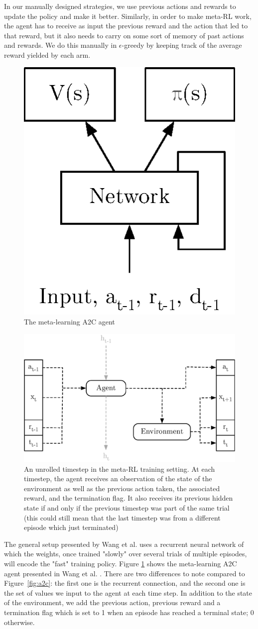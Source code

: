 In our manually designed strategies, we use previous actions and rewards
to update the policy and make it better. Similarly, in order to
make meta-RL work, the agent has to receive as input the previous reward
and the action that led to that reward, but it also needs to carry on some
sort of memory of past actions and rewards. We do this manually in 
$\epsilon$-greedy by keeping track of the average reward yielded by each arm.\\


\begin{figure}
	\centering
	\includegraphics[width=0.2\linewidth]{fig/a2c_meta.eps}
	\caption{The meta-learning A2C agent}
	\label{fig:a2c_meta}
\end{figure}

\begin{figure}
	\centering
	\includegraphics[width=0.6\linewidth]{fig/meta_rl_timestep.eps}
	\caption{An unrolled timestep in the meta-RL training setting. At each
	timestep, the agent receives an observation of the state of the
	environment as well as the previous action taken, the associated reward,
	and the termination flag. It also receives its previous hidden state
	if and only if the previous timestep was part of the same trial (this
	could still mean that the last timestep was from a different episode
	which just terminated)}
	\label{fig:meta_rl_timestep}
\end{figure}

The general setup presented by Wang et al. uses a recurrent neural network of
which the weights, once trained "slowly" over several trials of multiple
episodes, will encode the "fast" training policy.
Figure \ref{fig:a2c_meta} shows the meta-learning A2C agent presented in Wang
et al. \cite{learningtorl}. There are two differences to note compared to
Figure~\ref{fig:a2c}: the first one is the recurrent connection, and the
second one is the set of values we input to the agent at each time step. In
addition to the state of the environment, we add the previous action, 
previous reward and a termination flag which is set to 1 when an episode
has reached a terminal state; 0 otherwise.\\

